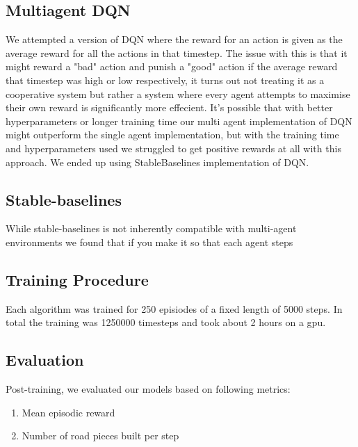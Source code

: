 \documentclass[conference]{IEEEtran}
\begin{document}
	\subsection{Multiagent DQN}
    We attempted a version of DQN where the reward for an action is given as the average reward for all the actions in that timestep. The issue with this is that it might reward a "bad" action and punish a "good" action if the average reward that timestep was high or low respectively, it turns out not treating it as a cooperative system but rather a system where every agent attempts to maximise their own reward is significantly more effecient. It's possible that with better hyperparameters or longer training time our multi agent implementation of DQN might outperform the single agent implementation, but with the training time and hyperparameters used we struggled to get positive rewards at all with this approach. We ended up using StableBaselines implementation of DQN.
	\subsection{Stable-baselines}
	While stable-baselines is not inherently compatible with multi-agent environments we found that if you
	make it so that each agent steps

	\subsection{Training Procedure}
	Each algorithm was trained for 250 episiodes of a fixed length of 5000 steps. In total the training was 1250000 timesteps and took about 2 hours on a gpu.

	\subsection{Evaluation}
	Post-training, we evaluated our models based on following metrics:
	\begin{enumerate}
		\item Mean episodic reward
		\item Number of road pieces built per step
	\end{enumerate}
\end{document}
